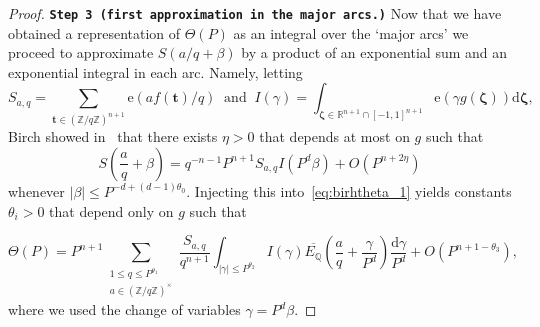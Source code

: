 \documentclass[a4paper,12pt,reqno]{amsart}
\numberwithin{equation}{section} \numberwithin{figure}{section}
\newcommand\Z{\mathbb{Z}}
\newcommand\Q{\mathbb{Q}}
\newcommand\R{\mathbb{R}}
\renewcommand{\b}{\mathbf}
\renewcommand{\leq}{\leqslant}
\renewcommand{\#}{\sharp}
\theoremstyle{definition}
\numberwithin{lemma}{section}
\newcommand{\beq}[2]
{
\begin{equation}
\label{#1}
{#2}
\end{equation}
}
\begin{document}
\begin{proof}
\textbf{\texttt{Step 3 (first approximation in the major arcs.)}}
Now that we have obtained a representation of $\Theta(P)$ as an integral over the `major arcs'
we proceed to approximate     $S(a/q+\beta)$ by  a product of an exponential sum and an exponential integral in each arc. 
Namely, letting 
$$S_{a,q}=\sum_{\b t \in (\Z/q\Z)^{n+1}  } \mathrm e(a f( \b t )/q) 
\ \textrm{ and } \ 
I(\gamma)=\int_{\boldsymbol \zeta \in \R^{n+1} \cap [-1,1]^{n+1} } \mathrm e (\gamma g(\boldsymbol \zeta ))\mathrm d \boldsymbol \zeta,$$
Birch showed in~\cite[Lemma 5.1]{Bir62} that there exists  $\eta>0$ that depends at most on $g $ such that 
$$S\left(\frac{a}{q}+\beta\right)
=q^{-n-1} P^{n+1} S_{a,q}I(P^d \beta)+O(P^{n+2\eta} )
$$ whenever $ |\beta | \leq  P^{-d+(d-1)\theta_0}$.
Injecting this into~\eqref{eq:birhtheta_1}
yields   constants $\theta_i>0$ that depend only on $ g$
such that 
\beq{eq:birhtheta_234}
{
 \Theta(P)= P^{n+1}
 \sum_{\substack{ 1\leq  q \leq P^{ \theta_1}\\
 a\in (\Z/q\Z)^\times   }} \frac{S_{a,q}}{q^{n+1} } 
  \int_{|\gamma|\leq P^{ \theta_2}} 
I(\gamma)
\overline{E_\Q}\left(\frac{a}{q}+\frac{ \gamma}{P^d}\right)
\frac{\mathrm d \gamma}{P^d}
+O(P^{n+1-\theta_3}) 
,} where we used the change of variables $\gamma= P^d \beta$.



\end{proof}
\end{document}
